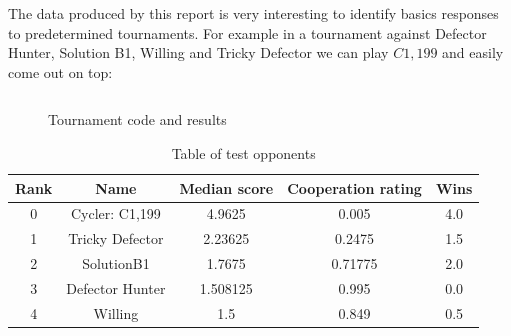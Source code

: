 The data produced by this report is very interesting to identify basics responses to predetermined tournaments. For example in a tournament against Defector Hunter, Solution B1, Willing and Tricky Defector we can play $C1,199$ and easily come out on top:

\begin{figure}
    \inputminted{python}{code_snippets/tournCode.py}
    \caption{Tournament code and results}\label{code:tournCode.py}
\end{figure}

\begin{table}
    \centering
    \begin{tabular}{ccccc}
        \toprule    
        Rank & Name & Median score & Cooperation rating & Wins \\
        \midrule
        0 & Cycler: C1,199 & 4.9625 & 0.005 & 4.0 \\ 
        1 & Tricky Defector & 2.23625 & 0.2475 & 1.5 \\ 
        2 & SolutionB1 & 1.7675 & 0.71775 & 2.0 \\ 
        3 & Defector Hunter & 1.508125 & 0.995 & 0.0 \\ 
        4 & Willing & 1.5 & 0.849 & 0.5 \\ 
        \bottomrule
    \end{tabular}
    \caption{Table of test opponents}\label{table:table_test_opsponents}
\end{table}
